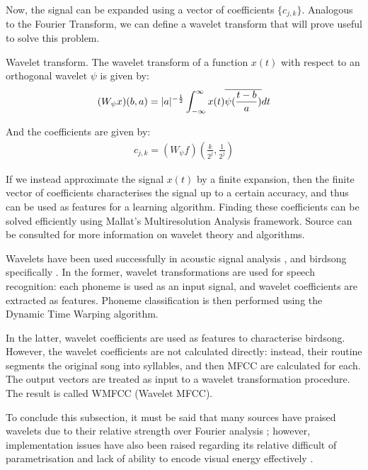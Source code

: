\documentclass[../main.tex]{subfiles} \label{chapter_soa}
\begin{document}
\par Now, the signal can be expanded using a vector of coefficients $\{c_{j,k}\}$. Analogous to the Fourier Transform, we can define a wavelet transform \cite{Weisstein2015a} that will prove useful to solve this problem.
\begin{definition}{Wavelet transform.} \label{def_wtransform} The wavelet transform of a function $x(t)$ with respect to an orthogonal wavelet $\psi$ is given by:
\begin{align*}
(W_\psi x)(b, a) = \lvert a\rvert^{-\frac{1}{2}}\int_{-\infty}^\infty x(t)\overline{\psi(\frac{t-b}{a})}dt
\end{align*}
\end{definition}
\par And the coefficients are given by:
\begin{align*}
c_{j,k} = (W_\psi f)(\frac{k}{2^j}, \frac{1}{2^j})
\end{align*}
\par If we instead approximate the signal $x(t)$ by a finite expansion, then the finite vector of coefficients characterises the signal up to a certain accuracy, and thus can be used as features for a learning algorithm. Finding these coefficients can be solved efficiently using Mallat's Multiresolution Analysis framework. Source \cite{Vidakovic1991} can be consulted for more information on wavelet theory and algorithms.
\par Wavelets have been used successfully in acoustic signal analysis \cite{Gamulkiewicz2003}, and birdsong specifically \cite{Chou2009}. In the former, wavelet transformations are used for speech recognition: each phoneme is used as an input signal, and wavelet coefficients are extracted as features. Phoneme classification is then performed using the Dynamic Time Warping algorithm. 
\par In the latter, wavelet coefficients are used as features to characterise birdsong. However, the wavelet coefficients are not calculated directly: instead, their routine segments the original song into syllables, and then MFCC are calculated for each. The output vectors are treated as input to a wavelet transformation procedure. The result is called WMFCC (Wavelet MFCC). 
\par To conclude this subsection, it must be said that many sources have praised wavelets due to their relative strength over Fourier analysis \cite{Gamulkiewicz2003,Weisstein2015a,Chui1992,Vidakovic1991}; however, implementation issues have also been raised regarding its relative difficult of parametrisation and lack of ability to encode visual energy effectively \cite{Garrett-Glaser2010}.
\end{document}
